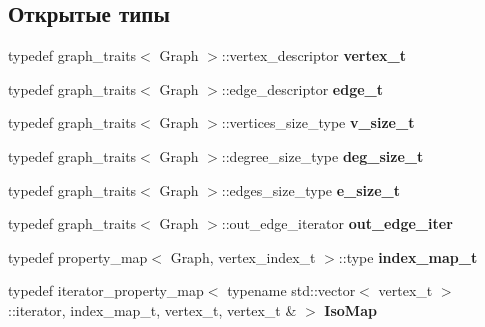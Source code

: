 \subsection*{Открытые типы}
\begin{DoxyCompactItemize}
\item 
\mbox{\label{structboost_1_1graph__test_ade600640dfb2ffd1bbcc4bb9db60a3f7}} 
typedef graph\+\_\+traits$<$ Graph $>$\+::vertex\+\_\+descriptor {\bfseries vertex\+\_\+t}
\item 
\mbox{\label{structboost_1_1graph__test_af426fe5948619eec56e311e769173650}} 
typedef graph\+\_\+traits$<$ Graph $>$\+::edge\+\_\+descriptor {\bfseries edge\+\_\+t}
\item 
\mbox{\label{structboost_1_1graph__test_a7cb70f96e2f1b68138299800859de7e8}} 
typedef graph\+\_\+traits$<$ Graph $>$\+::vertices\+\_\+size\+\_\+type {\bfseries v\+\_\+size\+\_\+t}
\item 
\mbox{\label{structboost_1_1graph__test_a063b71a61ac5e050f81bdb790bc88647}} 
typedef graph\+\_\+traits$<$ Graph $>$\+::degree\+\_\+size\+\_\+type {\bfseries deg\+\_\+size\+\_\+t}
\item 
\mbox{\label{structboost_1_1graph__test_a1c3818cea225fb663045266a1126a64e}} 
typedef graph\+\_\+traits$<$ Graph $>$\+::edges\+\_\+size\+\_\+type {\bfseries e\+\_\+size\+\_\+t}
\item 
\mbox{\label{structboost_1_1graph__test_ad37c27a29bf93c0df05d38b842e6cee1}} 
typedef graph\+\_\+traits$<$ Graph $>$\+::out\+\_\+edge\+\_\+iterator {\bfseries out\+\_\+edge\+\_\+iter}
\item 
\mbox{\label{structboost_1_1graph__test_abfc2081c0b9832f714e8da51f072c95f}} 
typedef property\+\_\+map$<$ Graph, vertex\+\_\+index\+\_\+t $>$\+::type {\bfseries index\+\_\+map\+\_\+t}
\item 
\mbox{\label{structboost_1_1graph__test_a5b4424db594ea6f0f239f40cff5d0034}} 
typedef iterator\+\_\+property\+\_\+map$<$ typename std\+::vector$<$ vertex\+\_\+t $>$\+::iterator, index\+\_\+map\+\_\+t, vertex\+\_\+t, vertex\+\_\+t \& $>$ {\bfseries Iso\+Map}
\end{DoxyCompactItemize}
